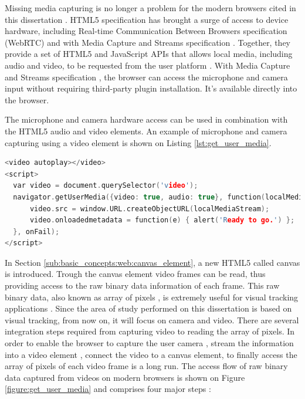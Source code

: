 Missing media capturing is no longer a problem for the modern browsers cited in this dissertation \cite{WebRTC2013,Hickson2013}. HTML5 specification has brought a surge of access to device hardware, including Real-time Communication Between Browsers specification (WebRTC) \cite{WebRTC2013} and with Media Capture and Streams specification \cite{MediaCapture2013}. Together, they provide a set of HTML5 and JavaScript APIs \cite{WebRTC2013} that allows local media, including audio and video, to be requested from the user platform \cite{WC2006}. With Media Capture and Streams specification \cite{MediaCapture2013}, the browser can access the microphone and camera input without requiring third-party plugin installation. It's available directly into the browser.

The microphone and camera hardware access can be used in combination with the HTML5 audio and video elements. An example of microphone and camera capturing using a video element is shown on Listing \ref{lst:get_user_media}.

\begin{lstlisting}[language=C++,label={lst:get_user_media},caption=Capture microphone and camera and display using a HTML5 video element.]
<video autoplay></video>
<script>
  var video = document.querySelector('video');
  navigator.getUserMedia({video: true, audio: true}, function(localMediaStream) {
      video.src = window.URL.createObjectURL(localMediaStream);
      video.onloadedmetadata = function(e) { alert('Ready to go.') };
  }, onFail);
</script>
\end{lstlisting}

In Section \ref{sub:basic_concepts:web:canvas_element}, a new HTML5 called canvas \cite{Canvas2013} is introduced. Trough the canvas element video frames can be read, thus providing access to the raw binary data information of each frame. This raw binary data, also known as array of pixels \cite{Gonzalez2007}, is extremely useful for visual tracking applications \cite{Teichrieb2007}. Since the area of study performed on this dissertation is based on visual tracking, from now on, it will focus on camera and video. There are several integration steps required from capturing video to reading the array of pixels. In order to enable the browser to capture the user camera \cite{MediaCapture2013}, stream the information into a video element \cite{Hickson2013}, connect the video to a canvas element, to finally access the array of pixels of each video frame is a long run. The access flow of raw binary data captured from videos on modern browsers is shown on Figure \ref{figure:get_user_media} and comprises four major steps \cite{WebRTC2013,Rocks2013}:


